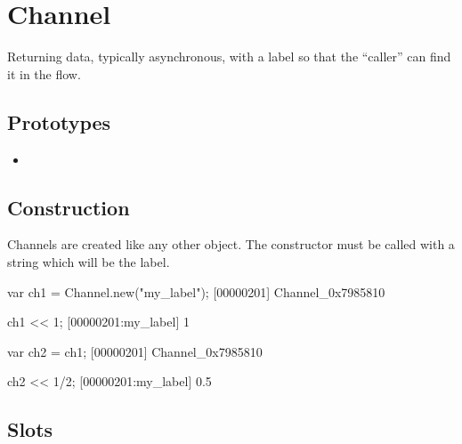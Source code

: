 
\section{Channel}
Returning data, typically asynchronous, with a label so that the
``caller'' can find it in the flow.

\subsection{Prototypes}

\begin{itemize}
\item {}
\end{itemize}

\subsection{Construction}

Channels are created like any other object. The constructor must be
called with a string which will be the label.

\begin{urbiscript}[firstnumber=1]
var ch1 = Channel.new("my_label");
[00000201] Channel_0x7985810

ch1 << 1;
[00000201:my_label] 1

var ch2 = ch1;
[00000201] Channel_0x7985810

ch2 << 1/2;
[00000201:my_label] 0.5
\end{urbiscript}

\subsection{Slots}

